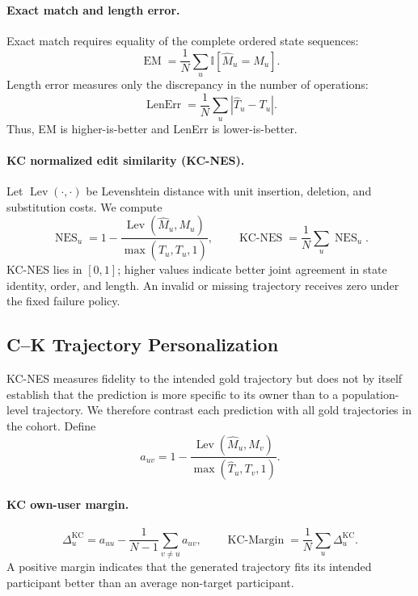 \paragraph{Exact match and length error.}
Exact match requires equality of the complete ordered state sequences:
\begin{equation}
\operatorname{EM}=\frac{1}{N}\sum_u
\mathbb I[\widehat M_u=M_u].
\label{eq:kc_exact_match}
\end{equation}
Length error measures only the discrepancy in the number of operations:
\begin{equation}
\operatorname{LenErr}=\frac{1}{N}\sum_u
\left|\widehat T_u-T_u\right|.
\label{eq:kc_length_error}
\end{equation}
Thus, EM is higher-is-better and LenErr is lower-is-better.

\paragraph{KC normalized edit similarity (KC-NES).}
Let \(\operatorname{Lev}(\cdot,\cdot)\) be Levenshtein distance with unit
insertion, deletion, and substitution costs. We compute
\begin{equation}
\operatorname{NES}_u
=1-\frac{\operatorname{Lev}(\widehat M_u,M_u)}
{\max(\widehat T_u,T_u,1)},
\qquad
\operatorname{KC\text{-}NES}=\frac{1}{N}\sum_u\operatorname{NES}_u .
\label{eq:kc_nes}
\end{equation}
KC-NES lies in \([0,1]\); higher values indicate better joint agreement in
state identity, order, and length. An invalid or missing trajectory receives
zero under the fixed failure policy.

\subsection{C--K Trajectory Personalization}

KC-NES measures fidelity to the intended gold trajectory but does not by
itself establish that the prediction is more specific to its owner than to a
population-level trajectory. We therefore contrast each prediction with all
gold trajectories in the cohort. Define
\begin{equation}
a_{uv}=1-\frac{\operatorname{Lev}(\widehat M_u,M_v)}
{\max(\widehat T_u,T_v,1)}.
\label{eq:kc_cross_user_similarity}
\end{equation}

\paragraph{KC own-user margin.}
\begin{equation}
\Delta_u^{\mathrm{KC}}
=a_{uu}-\frac{1}{N-1}\sum_{v\ne u}a_{uv},
\qquad
\operatorname{KC\text{-}Margin}
=\frac{1}{N}\sum_u\Delta_u^{\mathrm{KC}} .
\label{eq:kc_own_user_margin}
\end{equation}
A positive margin indicates that the generated trajectory fits its intended
participant better than an average non-target participant.

